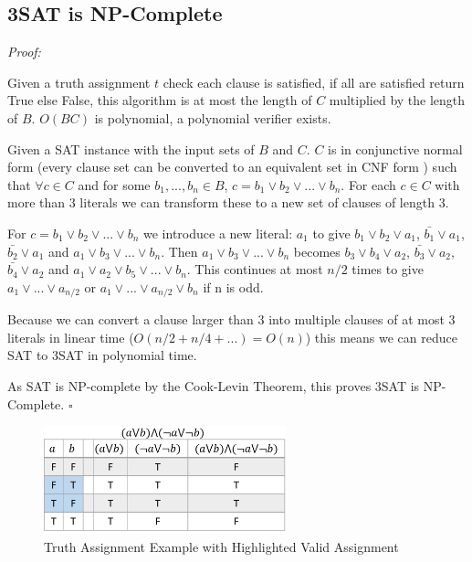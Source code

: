 \documentclass[a4paper,11pt]{report}
\begin{document}

\subsection{3SAT is NP-Complete}

\textit{Proof:}

Given a truth assignment $t$ check each clause is satisfied, if all are satisfied return True else False, this algorithm is at most the length of $C$ multiplied by the length of $B$. $O(BC)$ is polynomial, a polynomial verifier exists.

Given a SAT instance with the input sets of $B$ and $C$. $C$ is in conjunctive normal form (every clause set can be converted to an equivalent set in CNF form ) such that $\forall c \in C$ and for some $b_1, ... ,b_n \in B$, $c = b_1 \lor b_2
\lor ... \lor b_n$. For each $c \in C$ with more than 3 literals we can transform these to a new set of clauses of length 3.

For $c = b_1 \lor b_2 \lor ... \lor b_n$ we introduce a new literal: $a_1$ to give $b_1 \lor b_2 \lor a_1$, $\bar{b_1} \lor a_1$, $\bar{b_2} \lor a_1$ and $a_1 \lor b_3 \lor ... \lor b_n$. Then $a_1 \lor b_3 \lor ... \lor b_n$ becomes $b_3 \lor b_4 \lor a_2$, $\bar{b_3} \lor a_2$, $\bar{b_4} \lor a_2$ and $a_1 \lor a_2 \lor b_5 \lor ... \lor b_n$. This continues at most $n/2$ times to give $a_1 \lor ... \lor a_{n/2}$ or $a_1 \lor ... \lor a_{n/2} \lor b_n$ if n is odd.

Because we can convert a clause larger than 3 into multiple clauses of at most 3 literals in linear time ($O(n/2 + n/4 + ...) = O(n)$) this means we can reduce SAT to 3SAT in polynomial time.

As SAT is NP-complete by the Cook-Levin Theorem, this proves 3SAT is NP-Complete. $\square$
		
\begin{figure}
\begin{center}
		\includegraphics[width=70mm]{figures/sat_example.png}
\end{center}
		\caption{Truth Assignment Example with Highlighted Valid Assignment}
\end{figure}
\end{document}
